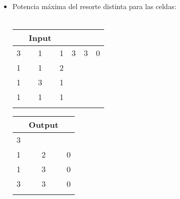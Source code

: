 \documentclass[11pt, a4paper, twoside]{article}
\begin{document}
\begin{itemize}
\begin{itemize}
\begin{itemize}
				\item Potencia máxima del resorte distinta para las celdas: \\
				\\
				    \begin{minipage}{0.4\textwidth}
							\begin{tabular}{cccccc}
							 & Input \\
							   \hline
							   3 & 1 & 1 & 3 & 3 & 0\\
							   1 & 1 & 2 &   &   &  \\
							   1 & 3 & 1 &   &   &  \\
							   1 & 1 & 1 &   &   &  \\
							   \\
							\end{tabular}
						\end{minipage} 
							\begin{minipage}{0.3\textwidth}
								\begin{tabular}{ccc}
								  & Output \\
								   \hline
								   3 &   &   \\
								   1 & 2 & 0 \\
								   1 & 3 & 0 \\
								   3 & 3 & 0 \\
								    \\
							\end{tabular}
					\end{minipage} 	\\
					\\
					

\end{itemize}
\end{itemize}
\end{itemize}
\end{document}
